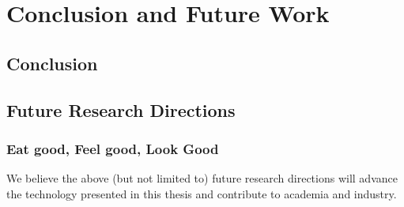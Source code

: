 \chapter{Conclusion and Future Work}
\label{ch:concl}

\section{Conclusion}

\lipsum[1-2]

\section{Future Research Directions}

\lipsum[4]

\subsection{Eat good, Feel good, Look Good}

\lipsum[5]

\vspace{2em}

We believe the above (but not limited to) future research directions will advance the technology presented in this thesis and contribute to academia and industry.
